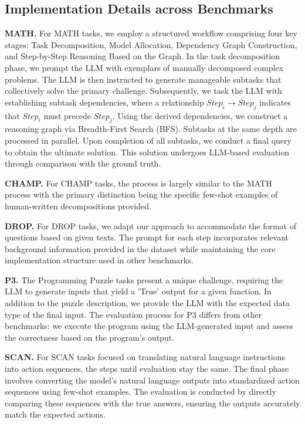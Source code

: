 \vspace{-2mm}
\subsection{Implementation Details across Benchmarks}
\label{appendix:imple_details}
\textbf{MATH.}
For MATH tasks, we employ a structured workflow comprising four key stages: Task Decomposition, Model Allocation, Dependency Graph Construction, and Step-by-Step Reasoning Based on the Graph.
In the task decomposition phase, we prompt the LLM with exemplars of manually decomposed complex problems. The LLM is then instructed to generate manageable subtasks that collectively solve the primary challenge. Subsequently, we task the LLM with establishing subtask dependencies, where a relationship $Step_i \rightarrow Step_j$ indicates that $Step_i$ must precede $Step_j$.
Using the derived dependencies, we construct a reasoning graph via Breadth-First Search (BFS). Subtasks at the same depth are processed in parallel. Upon completion of all subtasks, we conduct a final query to obtain the ultimate solution. This solution undergoes LLM-based evaluation through comparison with the ground truth.

\textbf{CHAMP.}
For CHAMP tasks, the process is largely similar to the MATH process with the primary distinction being the specific few-shot examples of human-written decompositions provided.

\textbf{DROP.}
For DROP tasks, we adapt our approach to accommodate the format of questions based on given texts. The prompt for each step incorporates relevant background information provided in the dataset while maintaining the core implementation structure used in other benchmarks.

\textbf{P3.}
The Programming Puzzle tasks present a unique challenge, requiring the LLM to generate inputs that yield a 'True' output for a given function. In addition to the puzzle description, we provide the LLM with the expected data type of the final input. The evaluation process for P3 differs from other benchmarks: we execute the program using the LLM-generated input and assess the correctness based on the program's output.

\textbf{SCAN.}
For SCAN tasks focused on translating natural language instructions into action sequences, the steps until evaluation stay the same. The final phase involves converting the model's natural language outputs into standardized action sequences using few-shot examples. The evaluation is conducted by directly comparing these sequences with the true answers, ensuring the outputs accurately match the expected actions.

